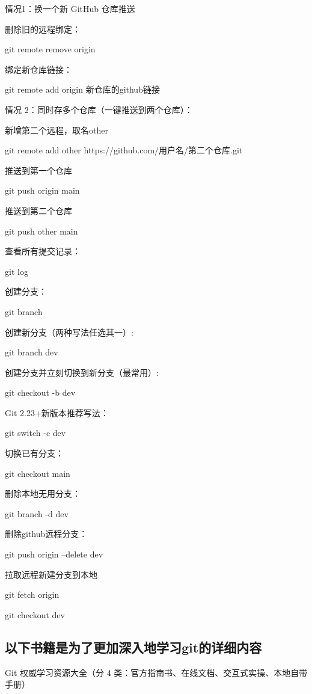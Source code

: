 \documentclass[12pt,a4paper]{article}
\begin{document}
情况1：换一个新 GitHub 仓库推送\par
删除旧的远程绑定：\par
git remote remove origin\par
绑定新仓库链接：\par
git remote add origin 新仓库的github链接\par

情况 2：同时存多个仓库（一键推送到两个仓库）：\par

新增第二个远程，取名other\par
git remote add other https://github.com/用户名/第二个仓库.git\par

推送到第一个仓库\par
git push origin main\par
推送到第二个仓库\par
git push other main\par

查看所有提交记录：\par
git log\par


创建分支：\par
git branch \par
创建新分支（两种写法任选其一）:\par
git branch dev\par
创建分支并立刻切换到新分支（最常用）:\par
git checkout -b dev\par
Git 2.23+新版本推荐写法：\par
git switch -c dev\par

切换已有分支：\par
git checkout main\par
删除本地无用分支：\par
git branch -d dev\par
删除github远程分支：\par
git push origin --delete dev\par
拉取远程新建分支到本地\par
git fetch origin\par
git checkout dev\par


\subsection*{以下书籍是为了更加深入地学习git的详细内容}
Git 权威学习资源大全（分 4 类：官方指南书、在线文档、交互式实操、本地自带手册）
\end{document}
